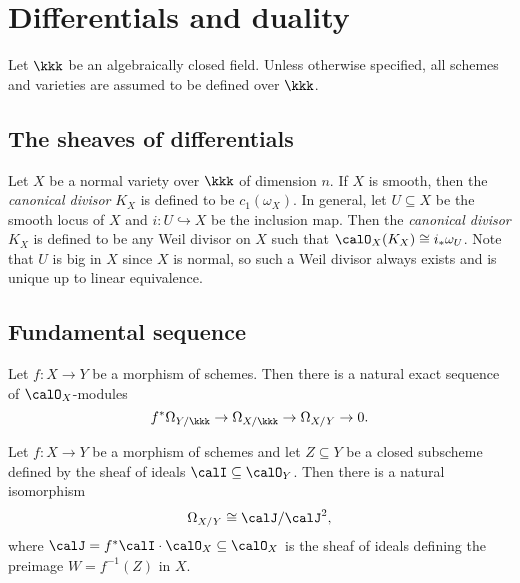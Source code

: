 \section{Differentials and duality}

Let \(\kkk\) be an algebraically closed field.
Unless otherwise specified, all schemes and varieties are assumed to be defined over \(\kkk\).

\subsection{The sheaves of differentials}

    \begin{definition}\label{def:canonical_divisor_on_normal_varieties}
        Let \(X\) be a normal variety over \(\kkk\) of dimension \(n\).
        If \(X\) is smooth, then the \emph{canonical divisor} \(K_X\) is defined to be \(c_1(\omega_X)\).
        In general, let \(U\subseteq X\) be the smooth locus of \(X\) and \(i:U\hookrightarrow X\) be the inclusion map.
        Then the \emph{canonical divisor} \(K_X\) is defined to be any Weil divisor on \(X\) such that \(\calO_X(K_X)\cong i_*\omega_U\).
        Note that \(U\) is big in \(X\) since \(X\) is normal, so such a Weil divisor always exists and is unique up to linear equivalence.
    \end{definition}

\subsection{Fundamental sequence}

    \begin{theorem}\label{thm:the_first_fundamental_sequence_of_differentials}
        Let \(f: X \to Y\) be a morphism of schemes.
        Then there is a natural exact sequence of \(\calO_X\)-modules
        \[
            f^* \Omega_{Y/\kkk} \to \Omega_{X/\kkk} \to \Omega_{X/Y} \to 0.
        \]
    \end{theorem}

    \begin{theorem}\label{thm:ramification_formula}
        Let \(f: X \to Y\) be a morphism of schemes and let \(Z \subseteq Y\) be a closed subscheme defined by the sheaf of ideals \(\calI \subseteq \calO_Y\). Then there is a natural isomorphism
        \[
            \Omega_{X/Y} \cong \calJ/\calJ^2,
        \]
        where \(\calJ = f^*\calI \cdot \calO_X \subseteq \calO_X\) is the sheaf of ideals defining the preimage \(W = f^{-1}(Z)\) in \(X\).
    \end{theorem}

